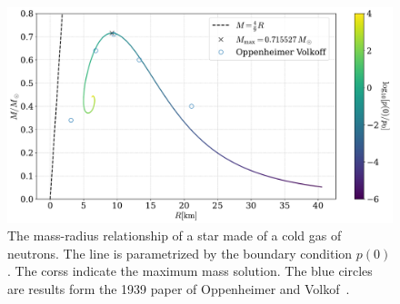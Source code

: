 \begin{figure}
    \centering
    \includegraphics[width=\textwidth]{../scripts/figurer/mass_radius_neutron.pdf}
    \caption{The mass-radius relationship of a star made of a cold gas of neutrons. The line is parametrized by the boundary condition $p(0)$. The corss indicate the maximum mass solution. The blue circles are results form the 1939 paper of Oppenheimer and Volkof~\autocite{oppenheimerMassiveNeutronCores1939}.}
    \label{fig: mass radius relationship fermi gas}
\end{figure}


